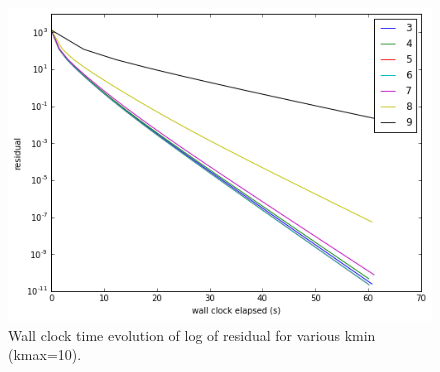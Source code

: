 \documentclass[letterpaper,10pt]{article}
\begin{document}
\begin{figure}[!htb]
\centering
\includegraphics[width=1\textwidth]{restime.PNG}
\caption{Wall clock time evolution of log of residual for various kmin (kmax=10).}
\end{figure}
\end{document}
